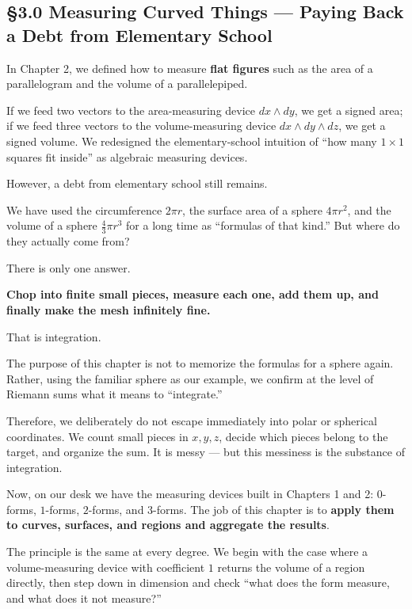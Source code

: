 \documentclass[a4paper,12pt,openany]{book}
\begin{document}
\hypertarget{measuring-curved-things-paying-back-a-debt-from-elementary-school}{%
\subsection{§3.0 Measuring Curved Things — Paying Back a Debt from
Elementary
School}\label{measuring-curved-things-paying-back-a-debt-from-elementary-school}}

In Chapter 2, we defined how to measure \textbf{flat figures} such as
the area of a parallelogram and the volume of a parallelepiped.

If we feed two vectors to the area-measuring device \(dx \wedge dy\), we
get a signed area; if we feed three vectors to the volume-measuring
device \(dx \wedge dy \wedge dz\), we get a signed volume. We redesigned
the elementary-school intuition of ``how many \(1\times 1\) squares fit
inside'' as algebraic measuring devices.

However, a debt from elementary school still remains.

We have used the circumference \(2\pi r\), the surface area of a sphere
\(4\pi r^2\), and the volume of a sphere \(\frac{4}{3}\pi r^3\) for a
long time as ``formulas of that kind.'' But where do they actually come
from?

There is only one answer.

\textbf{Chop into finite small pieces, measure each one, add them up, and finally make the mesh infinitely fine.}

That is integration.

The purpose of this chapter is not to memorize the formulas for a sphere
again. Rather, using the familiar sphere as our example, we confirm at
the level of Riemann sums what it means to ``integrate.''

Therefore, we deliberately do not escape immediately into polar or
spherical coordinates. We count small pieces in \(x,y,z\), decide which
pieces belong to the target, and organize the sum. It is messy — but
this messiness is the substance of integration.

Now, on our desk we have the measuring devices built in Chapters 1 and
2: \(0\)-forms, \(1\)-forms, \(2\)-forms, and \(3\)-forms. The job of
this chapter is to
\textbf{apply them to curves, surfaces, and regions and aggregate the results}.

The principle is the same at every degree. We begin with the case where
a volume-measuring device with coefficient \(1\) returns the volume of a
region directly, then step down in dimension and check ``what does the
form measure, and what does it not measure?''
\end{document}
